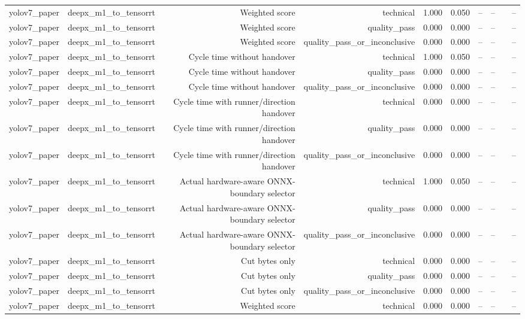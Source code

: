 \begin{table}[t]
\begin{tabular}{lrrrrrrrrr}
yolov7\_paper & deepx\_m1\_to\_tensorrt & Weighted score & technical & 1.000 & 0.050 & -- & -- &  & -- \\
yolov7\_paper & deepx\_m1\_to\_tensorrt & Weighted score & quality\_pass & 0.000 & 0.000 & -- & -- &  & -- \\
yolov7\_paper & deepx\_m1\_to\_tensorrt & Weighted score & quality\_pass\_or\_inconclusive & 0.000 & 0.000 & -- & -- &  & -- \\
yolov7\_paper & deepx\_m1\_to\_tensorrt & Cycle time without handover & technical & 1.000 & 0.050 & -- & -- &  & -- \\
yolov7\_paper & deepx\_m1\_to\_tensorrt & Cycle time without handover & quality\_pass & 0.000 & 0.000 & -- & -- &  & -- \\
yolov7\_paper & deepx\_m1\_to\_tensorrt & Cycle time without handover & quality\_pass\_or\_inconclusive & 0.000 & 0.000 & -- & -- &  & -- \\
yolov7\_paper & deepx\_m1\_to\_tensorrt & Cycle time with runner/direction handover & technical & 0.000 & 0.000 & -- & -- &  & -- \\
yolov7\_paper & deepx\_m1\_to\_tensorrt & Cycle time with runner/direction handover & quality\_pass & 0.000 & 0.000 & -- & -- &  & -- \\
yolov7\_paper & deepx\_m1\_to\_tensorrt & Cycle time with runner/direction handover & quality\_pass\_or\_inconclusive & 0.000 & 0.000 & -- & -- &  & -- \\
yolov7\_paper & deepx\_m1\_to\_tensorrt & Actual hardware-aware ONNX-boundary selector & technical & 1.000 & 0.050 & -- & -- &  & -- \\
yolov7\_paper & deepx\_m1\_to\_tensorrt & Actual hardware-aware ONNX-boundary selector & quality\_pass & 0.000 & 0.000 & -- & -- &  & -- \\
yolov7\_paper & deepx\_m1\_to\_tensorrt & Actual hardware-aware ONNX-boundary selector & quality\_pass\_or\_inconclusive & 0.000 & 0.000 & -- & -- &  & -- \\
yolov7\_paper & deepx\_m1\_to\_tensorrt & Cut bytes only & technical & 0.000 & 0.000 & -- & -- &  & -- \\
yolov7\_paper & deepx\_m1\_to\_tensorrt & Cut bytes only & quality\_pass & 0.000 & 0.000 & -- & -- &  & -- \\
yolov7\_paper & deepx\_m1\_to\_tensorrt & Cut bytes only & quality\_pass\_or\_inconclusive & 0.000 & 0.000 & -- & -- &  & -- \\
yolov7\_paper & deepx\_m1\_to\_tensorrt & Weighted score & technical & 0.000 & 0.000 & -- & -- &  & -- \\

\end{tabular}
\end{table}
